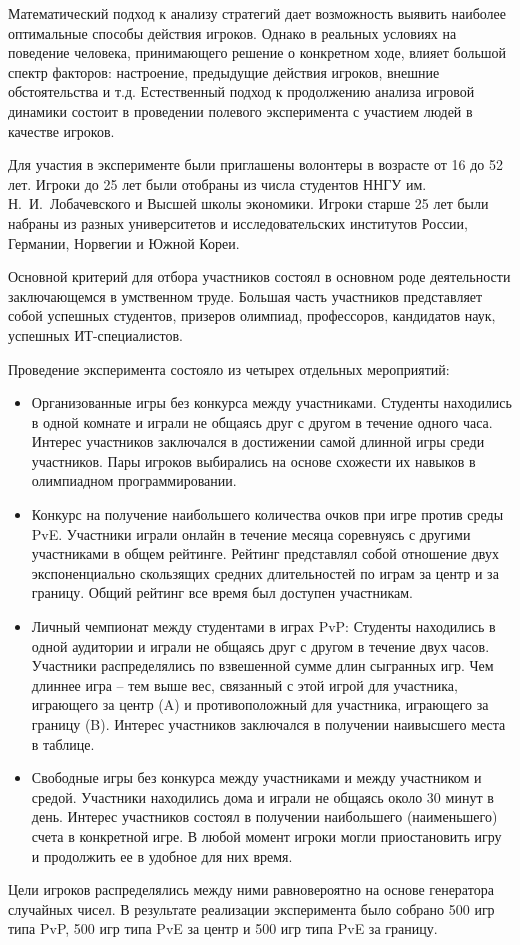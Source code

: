 Математический подход к анализу стратегий дает возможность выявить наиболее оптимальные 
способы действия игроков. Однако в реальных условиях на поведение человека, принимающего решение
о конкретном ходе, влияет большой спектр факторов: настроение, предыдущие действия игроков, внешние обстоятельства и т.д.
Естественный подход к продолжению анализа игровой динамики состоит в проведении полевого эксперимента
с участием людей в качестве игроков. 

Для участия в эксперименте были приглашены волонтеры в возрасте от 16 до 52 лет. 
Игроки до 25 лет были отобраны из числа студентов ННГУ им. Н.~И.~Лобачевского и Высшей школы экономики. 
Игроки старше 25 лет были набраны из разных университетов и исследовательских институтов России, Германии, Норвегии и Южной Кореи.

Основной критерий для отбора участников состоял в основном роде деятельности заключающемся в умственном труде.
Большая часть участников представляет собой успешных студентов, призеров олимпиад, профессоров, кандидатов наук, успешных ИТ-специалистов.

Проведение эксперимента состояло из четырех отдельных мероприятий:
\begin{itemize}
\item Организованные игры без конкурса между участниками.
    Студенты находились в одной комнате и играли не общаясь друг с другом в течение одного часа. 
    Интерес участников заключался в достижении самой длинной игры среди участников. 
    Пары игроков выбирались на основе схожести их навыков в олимпиадном программировании.
\item Конкурс на получение наибольшего количества очков при игре против среды PvE.
    Участники играли онлайн в течение месяца соревнуясь с другими участниками в общем рейтинге.
    Рейтинг представлял собой отношение двух экспоненциально скользящих средних длительностей по играм за центр и за границу.
    Общий рейтинг все время был доступен участникам.
\item Личный чемпионат между студентами в играх PvP: 
    Студенты находились в одной аудитории и играли не общаясь друг с другом в течение двух часов. 
    Участники распределялись по взвешенной сумме длин сыгранных игр. 
    Чем длиннее игра -- тем выше вес, связанный с этой игрой для участника, играющего за центр (A) и противоположный для участника, играющего за границу (B).
    Интерес участников заключался в получении наивысшего места в таблице.
\item Свободные игры без конкурса между участниками и между участником и средой.
      Участники находились дома и играли не общаясь около 30 минут в день. 
      Интерес участников состоял в получении наибольшего (наименьшего) счета в конкретной игре.
      В любой момент игроки могли приостановить игру и продолжить ее в удобное для них время.
\end{itemize}
Цели игроков распределялись между ними равновероятно на основе генератора случайных чисел.
В результате реализации эксперимента было собрано 500 игр типа PvP, 500 игр типа PvE за центр и 500 игр типа PvE за границу.

